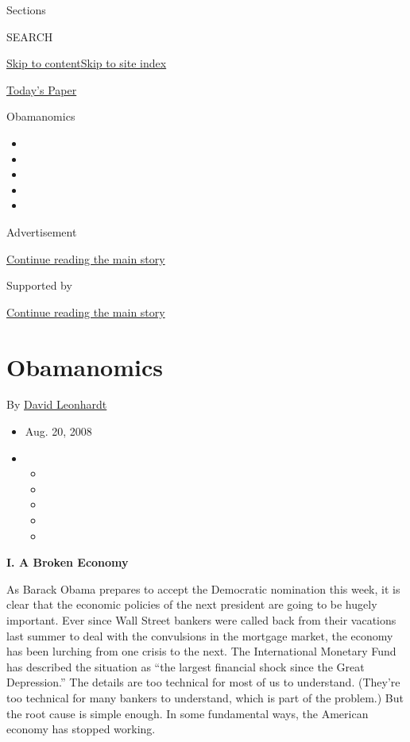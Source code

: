 Sections

SEARCH

\protect\hyperlink{site-content}{Skip to
content}\protect\hyperlink{site-index}{Skip to site index}

\href{https://myaccount.nytimes.com/auth/login?response_type=cookie\&client_id=vi}{}

\href{https://www.nytimes.com/section/todayspaper}{Today's Paper}

Obamanomics

\begin{itemize}
\item
\item
\item
\item
\item
\end{itemize}

Advertisement

\protect\hyperlink{after-top}{Continue reading the main story}

Supported by

\protect\hyperlink{after-sponsor}{Continue reading the main story}

\hypertarget{obamanomics}{%
\section{Obamanomics}\label{obamanomics}}

By \href{https://www.nytimes.com/by/david-leonhardt}{David Leonhardt}

\begin{itemize}
\item
  Aug. 20, 2008
\item
  \begin{itemize}
  \item
  \item
  \item
  \item
  \item
  \end{itemize}
\end{itemize}

\textbf{I. A Broken Economy}

As Barack Obama prepares to accept the Democratic nomination this week,
it is clear that the economic policies of the next president are going
to be hugely important. Ever since Wall Street bankers were called back
from their vacations last summer to deal with the convulsions in the
mortgage market, the economy has been lurching from one crisis to the
next. The International Monetary Fund has described the situation as
``the largest financial shock since the Great Depression.'' The details
are too technical for most of us to understand. (They're too technical
for many bankers to understand, which is part of the problem.) But the
root cause is simple enough. In some fundamental ways, the American
economy has stopped working.

